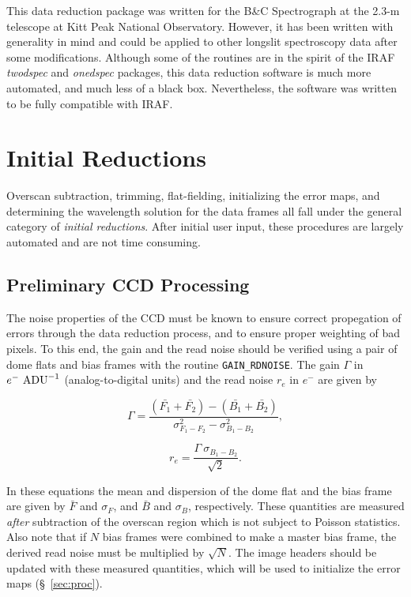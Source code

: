 \documentclass[12pt,preprint]{aastex}
\begin{document}
This data reduction package was written for the B\&C Spectrograph at
the 2.3-m telescope at Kitt Peak National Observatory.  However, it
has been written with generality in mind and could be applied to other
longslit spectroscopy data after some modifications.  Although some of
the routines are in the spirit of the IRAF \emph{twodspec} and
\emph{onedspec} packages, this data reduction software is much more
automated, and much less of a black box.  Nevertheless, the software
was written to be fully compatible with IRAF.

\section{Initial Reductions}

Overscan subtraction, trimming, flat-fielding, initializing the
error maps, and determining the wavelength solution for the data
frames all fall under the general category of {\em initial
reductions}.  After initial user input, these procedures are largely
automated and are not time consuming.

\subsection{Preliminary CCD Processing}\label{sec:preproc}

The noise properties of the CCD must be known to ensure correct
propegation of errors through the data reduction process, and to
ensure proper weighting of bad pixels.  To this end, the gain and the
read noise should be verified using a pair of dome flats and bias
frames with the routine {\tt GAIN\_RDNOISE}.  The gain $\Gamma$ in
$e^{-}\ {\rm ADU}^{-1}$ (analog-to-digital units) and the read noise
$r_{e}$ in $e^{-}$ are given by

\begin{equation}
\Gamma = \frac{(\bar{F_{1}}+\bar{F_{2}}) -
(\bar{B_{1}}+\bar{B_{2}})} {\sigma^{2}_{F_{1}-F_{2}} -
\sigma^{2}_{B_{1}-B_{2}}},
\end{equation}

\begin{equation}
r_{e} = \frac{\Gamma \ \sigma_{B_{1}-B_{2}}}{\sqrt{2}}.
\end{equation}

\noindent In these equations the mean and dispersion of the dome flat
and the bias frame are given by $\bar{F}$ and $\sigma_{F}$, and
$\bar{B}$ and $\sigma_{B}$, respectively.  These quantities are
measured \emph{after} subtraction of the overscan region which is not
subject to Poisson statistics.  Also note that if $N$ bias frames were
combined to make a master bias frame, the derived read noise must be
multiplied by $\sqrt{N}$. 
The image headers should be updated with these measured quantities,
which will be used to initialize the error maps (\S~\ref{sec:proc}).
\end{document}
